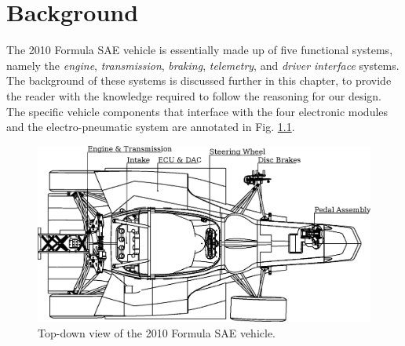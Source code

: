 \chapter{Background\label{cha:background}}

The 2010 Formula SAE vehicle is essentially made up of five functional systems, namely the \emph{engine}, \emph{transmission}, \emph{braking}, \emph{telemetry}, and \emph{driver interface} systems. The background of these systems is discussed further in this chapter, to provide the reader with the knowledge required to follow the reasoning for our design. The specific vehicle components that interface with the four electronic modules and the electro-pneumatic system are annotated in Fig. \ref{fig:background_overview_topdown}. 

\vspace{1em}
\begin{figure}[H]
\centering
\includegraphics[width=6in,keepaspectratio]{background/figures/background_diagram.eps}
\caption{Top-down view of the 2010 Formula SAE vehicle.}
\label{fig:background_overview_topdown}
\end{figure}






